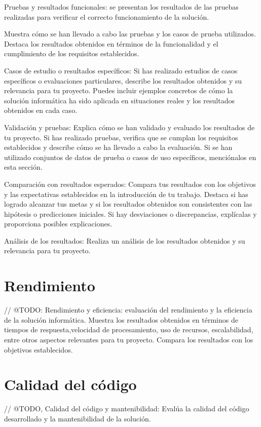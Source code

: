 Pruebas y resultados funcionales: se presentan los resultados de las pruebas realizadas para verificar el correcto
funcionamiento de la solución.

Muestra cómo se han llevado a cabo las pruebas y los casos de prueba utilizados.
Destaca los resultados obtenidos en términos de la funcionalidad y el cumplimiento de los requisitos establecidos.

Casos de estudio o resultados específicos: Si has realizado estudios de casos específicos o evaluaciones particulares,
describe los resultados obtenidos y su relevancia para tu proyecto.
Puedes incluir ejemplos concretos de cómo la solución informática ha sido aplicada en situaciones reales y los
resultados obtenidos en cada caso.

Validación y pruebas: Explica cómo se han validado y evaluado los resultados de tu proyecto.
Si has realizado pruebas, verifica que se cumplan los requisitos establecidos y describe cómo se ha llevado a cabo la
evaluación.
Si se han utilizado conjuntos de datos de prueba o casos de uso específicos, menciónalos en esta sección.

Comparación con resultados esperados: Compara tus resultados con los objetivos
y las expectativas establecidos en la introducción de tu trabajo.
Destaca si has logrado alcanzar tus metas y si los resultados obtenidos son consistentes con las hipótesis o
predicciones iniciales.
Si hay desviaciones o discrepancias, explícalas y proporciona posibles explicaciones.

Análisis de los resultados: Realiza un análisis de los resultados obtenidos y su relevancia para tu proyecto.


\section{Rendimiento}

// @TODO: Rendimiento y eficiencia: evaluación del rendimiento y la eficiencia de la solución informática.
Muestra los resultados obtenidos en términos de tiempos de respuesta,velocidad de procesamiento, uso de recursos,
escalabilidad, entre otros aspectos relevantes para tu proyecto.
Compara los resultados con los objetivos establecidos.


\section{Calidad del código}

// @TODO, Calidad del código y mantenibilidad:
Evalúa la calidad del código desarrollado y la mantenibilidad de la solución.



